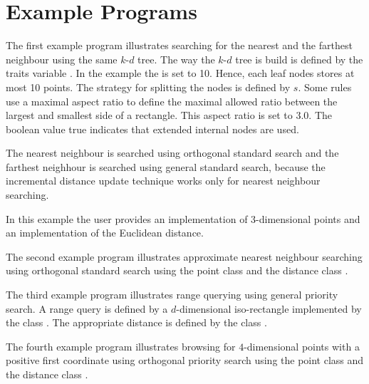 \section{Example Programs}

The first example program illustrates searching for the nearest and the farthest neighbour using the
same $k$-$d$ tree.
The way the $k$-$d$ tree is build is defined by the traits variable .
In the example the  is set to 10.
Hence, each leaf nodes stores at most 10 points.
The strategy for splitting the nodes is defined by $s$.
Some rules use a maximal aspect ratio to define
the maximal allowed ratio between the largest and smallest side of a rectangle.
This aspect ratio is set to 3.0. The boolean value true indicates that
extended internal nodes are used.

The nearest neighbour is searched using orthogonal standard search and
the farthest neighhour is searched using general standard search, because the
incremental distance update technique works only for nearest neighbour searching.

In this example the user provides an implementation of 3-dimensional points and an
implementation of the Euclidean distance.


The second example program illustrates approximate nearest neighbour searching
using orthogonal standard search using the point class 
and the distance class .
 

The third example program illustrates range querying using general priority search.
A range query is defined by a $d$-dimensional iso-rectangle implemented by
the class . The appropriate distance is defined by
the class .


The fourth example program illustrates browsing for $4$-dimensional points with
a positive first coordinate using orthogonal priority search
using the point class 
and the distance class .
 




